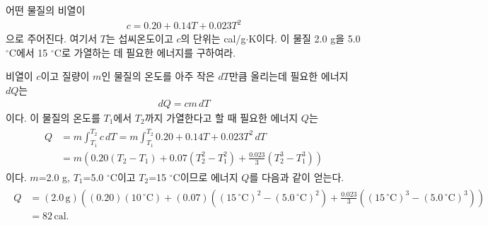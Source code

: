 \documentclass[floatfix,nofootinbib,superscriptaddress,fleqn]{revtex4-2}
\begin{document}
\vspace{1.cm}


어떤 물질의 비열이
\begin{align}
  \label{eq:1}
  c = 0.20 + 0.14 T + 0.023 T^2
\end{align}
으로 주어진다. 여기서 $T$는 섭씨온도이고 $c$의 단위는
cal/g$\cdot$K이다. 이 물질 2.0 g을 5.0 ${}^\circ\mathrm{C}$에서 15
${}^\circ\mathrm{C}$로 가열하는 데 필요한 에너지를 구하여라. 

\vspace{1.cm}
비열이 $c$이고 질량이 $m$인 물질의 온도를 아주 작은 $dT$만큼 올리는데 필요한 에너지 $dQ$는
\begin{align}
 dQ = cm\,d T
\end{align}
이다. 이 물질의 온도를 $T_1$에서 $T_2$까지 가열한다고 할 때 필요한 에너지 $Q$는
\begin{align}
  \begin{split}
    Q &= m\int^{T_2}_{T_1}c\,dT
    = m \int^{T_2}_{T_1}0.20 +0.14T+0.023T^2\,dT  \\
    &= m\left( 0.20\left(T_2-T_1\right)+0.07\left(T_2^2-T_1^2\right)
    +\frac{0.023}{3}\left(T_2^3-T_1^3\right) \right)
  \end{split}
\end{align}
이다. $m$=2.0 g, $T_1$=5.0 $\mathrm{^\circ C}$이고 $T_2$=15 $\mathrm{^\circ C}$이므로
에너지 $Q$를 다음과 같이 얻는다.
\begin{align}
  \begin{split}
    Q &= (2.0\,\mathrm{g})\left(  
      (0.20)(10\,\mathrm{^\circ C})+(0.07)\left(
        (15\,\mathrm{^\circ C})^2-  
      (5.0\,\mathrm{^\circ C})^2\right)
      +\frac{0.023}{3}\left((15\,\mathrm{^\circ C})^3-  
      (5.0\,\mathrm{^\circ C})^3\right)
      \right) \\
      &= 82\,\mathrm{cal}.
    \end{split}
\end{align}
\vspace{1.cm}
\end{document}
